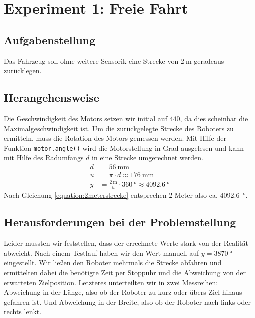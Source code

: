 \documentclass[ngerman]{tudscrreprt}
\newcommand{\code}[1]{\texttt{#1}}
\begin{document}
\section{Experiment 1: Freie Fahrt}
\subsection{Aufgabenstellung}
Das Fahrzeug soll ohne weitere Sensorik eine Strecke von $\SI{2}{\m}$ geradeaus zurücklegen.

\subsection{Herangehensweise}
Die Geschwindigkeit des Motors setzen wir initial auf $440$, da dies scheinbar die Maximalgeschwindigkeit ist. Um die zurückgelegte Strecke des Roboters zu ermitteln, muss die Rotation des Motors gemessen werden. Mit Hilfe der Funktion \code{motor.angle()} wird die Motorstellung in Grad ausgelesen und kann mit Hilfe des Radumfangs $d$ in eine Strecke umgerechnet werden.
%
\begin{equation}
    \label{equation:2meterstrecke}
    \begin{aligned}
       d &= \SI{56}{\mm}\\
       u &= \pi \cdot d \approx \SI{176}{\mm} \\
       y &= \frac{\SI{2}{\m}}{u} \cdot \SI{360}{\degree} \approx \SI{4092.6}{\degree}
    \end{aligned}
 \end{equation}
Nach Gleichung \ref{equation:2meterstrecke} entsprechen 2 Meter also ca. \SI{4092.6}{\degree}.

\subsection{Herausforderungen bei der Problemstellung}
Leider mussten wir feststellen, dass der errechnete Werte stark von der Realität abweicht. Nach einem Testlauf haben wir den Wert manuell auf $y = \SI{3870}{\degree}$ eingestellt. Wir ließen den Roboter mehrmals die Strecke abfahren und ermittelten dabei die benötigte Zeit per Stoppuhr und die Abweichung von der erwarteten Zielposition. Letzteres unterteilten wir in zwei Messreihen: Abweichung in der Länge, also ob der Roboter zu kurz oder übers Ziel hinaus gefahren ist. Und Abweichung in der Breite, also ob der Roboter nach links oder rechts lenkt.
\end{document}
